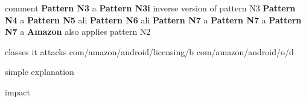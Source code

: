comment
\newline
\newline
\textbf{Pattern N3}\newline
a
\newline
\newline
\textbf{Pattern N3i}\newline
inverse version of pattern N3
\newline
\newline
\textbf{Pattern N4}\newline
a
\newline
\newline
\textbf{Pattern N5}\newline
ali
\newline
\newline
\textbf{Pattern N6}\newline
ali
\newline
\newline
\textbf{Pattern N7}\newline
a
\newline
\newline
\textbf{Pattern N7}\newline
a
\newline
\newline
\textbf{Pattern N7}\newline
a
\newline
\newline
\textbf{Amazon}\newline
also applies pattern N2

classes it attacks
com/amazon/android/licensing/b
com/amazon/android/o/d









simple explanation

impact

